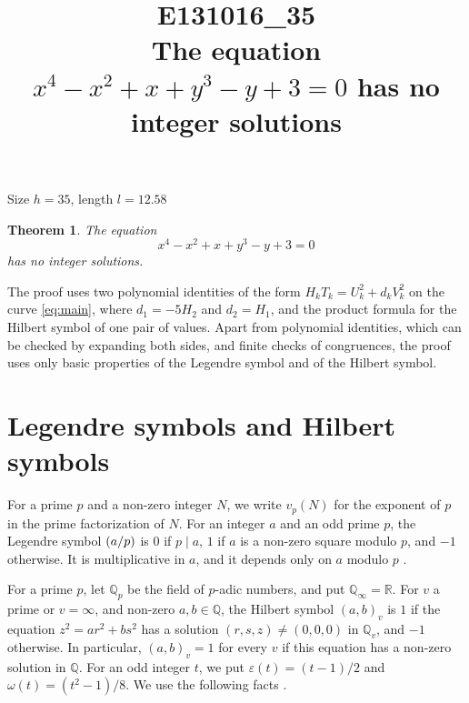 \documentclass[11pt]{article}
\title{\textbf{E131016\_35}\\[4pt] {\Large The equation $x^{4}-x^{2}+x+y^{3}-y+3=0$ has no integer solutions}}
\author{}
\date{}
\newtheorem{theorem}{Theorem}
\newcommand{\Q}{\mathbb{Q}}
\newcommand{\leg}[2]{\mathchoice{\biggl(\dfrac{#1}{#2}\biggr)}{(#1/#2)}{(#1/#2)}{(#1/#2)}}
\begin{document}
\maketitle
\vspace{-8ex}
\begin{center}
Size $h=35$, length $l=12.58$
\end{center}

\begin{theorem}\label{thm:main}
The equation
\begin{equation}\label{eq:main}
x^{4}-x^{2}+x+y^{3}-y+3=0
\end{equation}
has no integer solutions.
\end{theorem}

The proof uses two polynomial identities of the form $H_kT_k=U_k^2+d_kV_k^2$ on the curve \eqref{eq:main}, where $d_{1}=-5H_{2}$ and $d_{2}=H_{1}$, and the product formula for the Hilbert symbol of one pair of values. Apart from polynomial identities, which can be checked by expanding both sides, and finite checks of congruences, the proof uses only basic properties of the Legendre symbol and of the Hilbert symbol.

\section{Legendre symbols and Hilbert symbols}

For a prime $p$ and a non-zero integer $N$, we write $v_p(N)$ for the exponent of $p$ in the prime factorization of $N$. For an integer $a$ and an odd prime $p$, the Legendre symbol $\leg{a}{p}$ is $0$ if $p\mid a$, $1$ if $a$ is a non-zero square modulo $p$, and $-1$ otherwise. It is multiplicative in $a$, and it depends only on $a$ modulo $p$ \cite[Chapter~5]{IR}.

For a prime $p$, let $\Q_p$ be the field of $p$-adic numbers, and put $\Q_\infty=\mathbb R$. For $v$ a prime or $v=\infty$, and non-zero $a,b\in\Q$, the Hilbert symbol $(a,b)_v$ is $1$ if the equation $z^2=ar^2+bs^2$ has a solution $(r,s,z)\neq(0,0,0)$ in $\Q_v$, and $-1$ otherwise. In particular, $(a,b)_v=1$ for every $v$ if this equation has a non-zero solution in $\Q$. For an odd integer $t$, we put $\varepsilon(t)=(t-1)/2$ and $\omega(t)=(t^2-1)/8$. We use the following facts \cite[Chapter~III, Proposition~2 and Theorems~1 and~3]{Se}.
\end{document}
